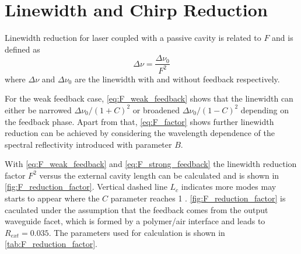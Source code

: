 \section{Linewidth and Chirp Reduction}\label{sec:linewidth_reduction}
Linewidth reduction for laser coupled with a passive cavity is related to $F$ and is defined as \cite{kazarinov1987relation, petermann2012laser}
\begin{equation}
    \Delta\nu=\frac{\Delta\nu_0}{F^2}
    \label{eq:linewidth_reduction}
\end{equation}
where $\Delta\nu$ and $\Delta\nu_0$ are the linewidth with and without feedback respectively. 

For the weak feedback case, \autoref{eq:F_weak_feedback} shows that the linewidth can either be narrowed $\Delta\nu_0/(1+C)^2$ or broadened $\Delta\nu_0/(1-C)^2$ depending on the feedback phase. Apart from that, \autoref{eq:F_factor} shows further linewidth reduction can be achieved by considering the wavelength dependence of the spectral reflectivity introduced with parameter $B$.

With \autoref{eq:F_weak_feedback} and \autoref{eq:F_strong_feedback} the linewidth reduction factor $F^2$ versus the external cavity length can be calculated and is shown in \autoref{fig:F_reduction_factor}. Vertical dashed line $L_c$ indicates more modes may starts to appear where the $C$ parameter reaches 1 \cite{petermann2012laser}. \autoref{fig:F_reduction_factor} is caculated under the assumption that the feedback comes from the output waveguide facet, which is formed by a polymer/air interface and leads to $R_{ext}=0.035$. The parameters used for calculation is shown in \autoref{tab:F_reduction_factor}.

